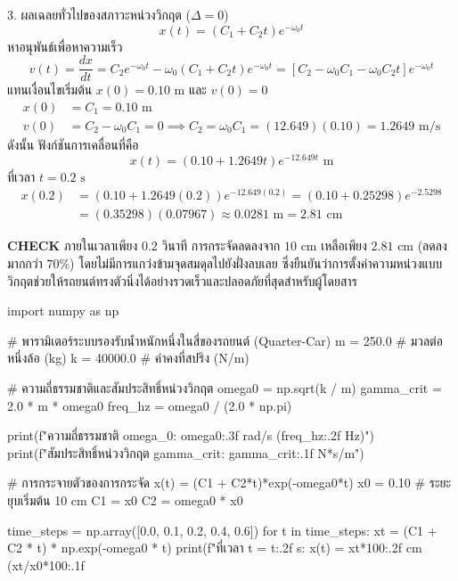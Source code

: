\begin{mathexample}
3. ผลเฉลยทั่วไปของสภาวะหน่วงวิกฤต ($\Delta = 0$)
\begin{equation}
x(t) = (C_1 + C_2 t)e^{-\omega_0 t}
\end{equation}
หาอนุพันธ์เพื่อหาความเร็ว
\begin{equation}
v(t) = \frac{dx}{dt} = C_2 e^{-\omega_0 t} - \omega_0 (C_1 + C_2 t)e^{-\omega_0 t} = [C_2 - \omega_0 C_1 - \omega_0 C_2 t]e^{-\omega_0 t}
\end{equation}
แทนเงื่อนไขเริ่มต้น $x(0) = 0.10\text{ m}$ และ $v(0) = 0$
\begin{align}
x(0) &= C_1 = 0.10\text{ m} \\
v(0) &= C_2 - \omega_0 C_1 = 0 \implies C_2 = \omega_0 C_1 = (12.649)(0.10) = 1.2649\text{ m/s}
\end{align}
ดังนั้น ฟังก์ชันการเคลื่อนที่คือ
\begin{equation}
x(t) = (0.10 + 1.2649 t)e^{-12.649 t}\text{ m}
\end{equation}
ที่เวลา $t = 0.2\text{ s}$
\begin{align}
x(0.2) &= (0.10 + 1.2649(0.2)) e^{-12.649(0.2)} = (0.10 + 0.25298) e^{-2.5298} \\
&= (0.35298)(0.07967) \approx 0.0281\text{ m} = 2.81\text{ cm}
\end{align}

\vspace{0.2cm}
\textbf{CHECK} ภายในเวลาเพียง $0.2\text{ วินาที}$ การกระจัดลดลงจาก $10\text{ cm}$ เหลือเพียง $2.81\text{ cm}$ (ลดลงมากกว่า $70\%$) โดยไม่มีการแกว่งข้ามจุดสมดุลไปยังฝั่งลบเลย ซึ่งยืนยันว่าการตั้งค่าความหน่วงแบบวิกฤตช่วยให้รถยนต์ทรงตัวนิ่งได้อย่างรวดเร็วและปลอดภัยที่สุดสำหรับผู้โดยสาร\qedexam

\begin{pythonbox}
import numpy as np

# พารามิเตอร์ระบบรองรับน้ำหนักหนึ่งในสี่ของรถยนต์ (Quarter-Car)
m = 250.0      # มวลต่อหนึ่งล้อ (kg)
k = 40000.0    # ค่าคงที่สปริง (N/m)

# ความถี่ธรรมชาติและสัมประสิทธิ์หน่วงวิกฤต
omega0 = np.sqrt(k / m)
gamma_crit = 2.0 * m * omega0
freq_hz = omega0 / (2.0 * np.pi)

print(f"ความถี่ธรรมชาติ omega_0: {omega0:.3f} rad/s ({freq_hz:.2f} Hz)")
print(f"สัมประสิทธิ์หน่วงวิกฤต gamma_crit: {gamma_crit:.1f} N*s/m")

# การกระจายตัวของการกระจัด x(t) = (C1 + C2*t)*exp(-omega0*t)
x0 = 0.10  # ระยะยุบเริ่มต้น 10 cm
C1 = x0
C2 = omega0 * x0

time_steps = np.array([0.0, 0.1, 0.2, 0.4, 0.6])
for t in time_steps:
    xt = (C1 + C2 * t) * np.exp(-omega0 * t)
    print(f"ที่เวลา t = {t:.2f} s: x(t) = {xt*100:.2f} cm ({xt/x0*100:.1f}%
\end{pythonbox}
\end{mathexample}

